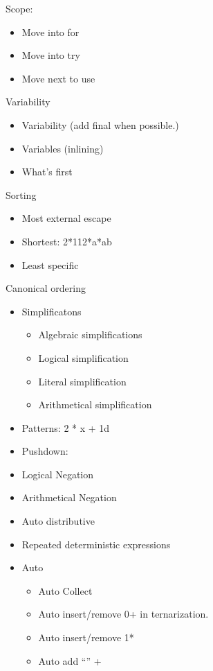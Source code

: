 \begin{itemize}
Scope:
\begin{itemize}
  \item Move into for
  \item Move into try
  \item Move next to use
\end{itemize}
Variability
\begin{itemize}
  \item Variability (add final when possible.)
  \item Variables (inlining)
  \item What’s first
\end{itemize}
Sorting
\begin{itemize}
  \item Most external escape
  \item Shortest: 2*112*a*ab
  \item Least specific
\end{itemize}
Canonical ordering
\begin{itemize}
  \item Simplificatons
        \begin{itemize}
          \item Algebraic simplifications
          \item Logical simplification
          \item Literal simplification
          \item Arithmetical simplification
        \end{itemize}
  \item Patterns: 2 * x + 1d
  \item Pushdown:
  \item Logical Negation
  \item Arithmetical Negation
  \item Auto distributive
  \item Repeated deterministic expressions
  \item Auto
        \begin{itemize}
          \item Auto Collect
          \item Auto insert/remove 0+ in ternarization.
          \item Auto insert/remove 1*
          \item Auto add “” +
        \end{itemize}
\end{itemize}


\end{itemize}
